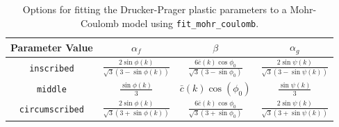 \begin{table}
\caption{\label{tab:fit_mohr_coulomb}Options for fitting the Drucker-Prager
plastic parameters to a Mohr-Coulomb model using \texttt{fit\_mohr\_coulomb}.}


\centering{}%
\begin{tabular}{|c|c|c|c|}
\hline 
\textbf{Parameter Value} & $\alpha_{f}$ & $\beta$ & $\alpha_{g}$\tabularnewline
\hline 
\hline 
\texttt{inscribed} & $\frac{2\sin\phi\left(k\right)}{\sqrt{3}\left(3-\sin\phi\left(k\right)\right)}$ & $\frac{6\bar{c}\left(k\right)\cos\phi_{0}}{\sqrt{3}\left(3-\sin\phi_{0}\right)}$ & $\frac{2\sin\psi(k)}{\sqrt{3}\left(3-\sin\psi\left(k\right)\right)}$\tabularnewline
\hline 
\texttt{middle} & $\frac{\sin\phi\left(k\right)}{3}$ & $\bar{c}\left(k\right)\cos\left(\phi_{0}\right)$ & $\frac{\sin\psi\left(k\right)}{3}$\tabularnewline
\hline 
\texttt{circumscribed} & $\frac{2\sin\phi\left(k\right)}{\sqrt{3}\left(3+\sin\phi\left(k\right)\right)}$ & $\frac{6\bar{c}\left(k\right)\cos\phi_{0}}{\sqrt{3}\left(3+\sin\phi_{0}\right)}$ & $\frac{2\sin\psi(k)}{\sqrt{3}\left(3+\sin\psi\left(k\right)\right)}$\tabularnewline
\hline 
\end{tabular}
\end{table}


